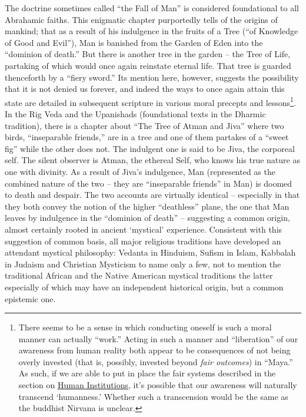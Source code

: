 \documentclass[pra,twocolumn,groupedaddress,10pt]{revtex4}
\theoremstyle{definition}
\begin{document}
The doctrine sometimes called ``the Fall of Man'' is considered foundational to all Abrahamic faiths. This enigmatic chapter purportedly tells of the origins of mankind; that as a result of his indulgence in the fruits of a Tree (``of Knowledge of Good and Evil''), Man is banished from the Garden of Eden into the ``dominion of death.''\cite{genesisfallofman} But there is another tree in the garden -- the Tree of Life, partaking of which would once again reinstate eternal life. That tree is guarded thenceforth by a ``fiery sword.'' Its mention here, however, suggests the possibility that it is not denied us forever, and indeed the ways to once again attain this state are detailed in subsequent scripture in various moral precepts and lessons\footnote{There seems to be a sense in which conducting oneself is such a moral manner can actually ``work.'' Acting in such a manner and ``liberation'' of our awareness from human reality both appear to be consequences of not being overly invested (that is, possibly, invested beyond \textit{fair outcomes}) in ``Maya.'' As such, if we are able to put in place the fair systems described in the section on \hyperref[sec:humins]{Human Institutions}, it's possible that our awareness will naturally transcend `humanness.' Whether such a transcension would be the same as the buddhist Nirvana is unclear.}. In the Rig Veda and the Upanishads (foundational texts in the Dharmic tradition), there is a chapter about ``The Tree of Atman and Jiva''\cite{mundakaupanishad} where two birds, ``inseparable friends,'' are in a tree and one of them partakes of a ``sweet fig'' while the other does not. The indulgent one is said to be Jiva, the corporeal self. The silent observer is Atman, the ethereal Self, who knows his true nature as one with divinity. As a result of Jiva's indulgence, Man (represented as the combined nature of the two -- they are ``inseparable friends'' in Man) is doomed to death and despair. The two accounts are virtually identical -- especially in that they both convey the notion of the higher ``deathless'' plane, the one that Man leaves by indulgence in the ``dominion of death'' -- suggesting a common origin, almost certainly rooted in ancient `mystical' experience. Consistent with this suggestion of common basis, all major religious traditions have developed an attendant mystical philosophy: Vedanta in Hinduism, Sufism in Islam, Kabbalah in Judaism and Christian Mysticism to name only a few, not to mention the traditional African and the Native American mystical traditions the latter especially of which may have an independent historical origin, but a common epistemic one.
\end{document}
